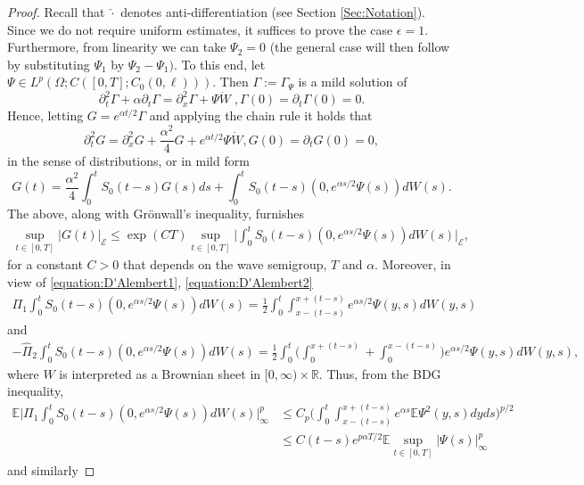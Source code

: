 \documentclass[10pt, reqno]{amsart}
\newcommand{\R}{\mathbb{R}}
\newcommand{\ex}{\mathbb{E}}
\newcommand{\e}{\mathcal{E}}
\theoremstyle{definition}
\numberwithin{lem}{section}
\numberwithin{cor}{section}
\numberwithin{prop}{section}
\numberwithin{thm}{section}
\numberwithin{dfn}{section}
\begin{document}
 \begin{proof}
 Recall that $\hat{\cdot}$ denotes anti-differentiation (see Section \ref{Sec:Notation}). Since we do not require uniform estimates, it suffices to prove the case $\epsilon=1.$ Furthermore, from linearity we can take $\Psi_2=0$ (the general case will then follow by substituting $\Psi_1$ by $\Psi_2-\Psi_1).$ To this end, let $\Psi\in L^p(\Omega; C([0,T]; C_0(0,\ell))).$ Then $\Gamma:=\Gamma_{\Psi}$ is a mild solution of
 $$ \partial_t^2\Gamma+\alpha\partial_t\Gamma=\partial^2_{x}\Gamma+\Psi\dot{W}\;, \Gamma(0)=\partial_t\Gamma(0)=0.     $$
 Hence, letting $G=e^{\alpha t/2}\Gamma$ and applying the chain rule it holds that 
 $$  \partial_t^2G=\partial^2_{x}G+\frac{\alpha^2}{4}G+e^{\alpha t/2}\Psi\dot{W}, G(0)=\partial_tG(0)=0,$$
in the sense of distributions, or in mild form
$$G(t)=\frac{\alpha^2}{4}\int_0^ t S_0(t-s)G(s)ds+\int_0^t S_0(t-s)(0, e^{\alpha s/2}\Psi(s))dW(s).$$
\noindent The above, along with Gr\"onwall's inequality, furnishes
\begin{equation*}
\begin{aligned}
    \sup_{t\in[0,T]}|G(t)|_{\e}\leq \exp(C T)\sup_{t\in[0,T]}\bigg|\int_0^t S_0(t-s)(0, e^{\alpha s/2}\Psi(s))dW(s)   \bigg|_{\e},
\end{aligned} 
\end{equation*}
for a constant $C>0$ that depends on the wave semigroup, $T$ and $\alpha.$
Moreover, in view of \eqref{equation:D'Alembert1}, \eqref{equation:D'Alembert2}
\begin{equation*}
\begin{aligned}
    \Pi_1\int_0^t S_0(t-s)(0, e^{\alpha s/2}\Psi(s))dW(s)
  =\frac{1}{2}\int_0^t\int_{x-(t-s)}^{x+(t-s)}e^{\alpha s/2}\Psi(y,s)dW(y,s)
\end{aligned} 
\end{equation*}
and 
\begin{equation*}
\begin{aligned}
     -\widehat{\Pi}_2\int_0^t S_0(t-s)(0, e^{\alpha s/2}\Psi(s))dW(s)= \frac{1}{2}\int_0^t\bigg(\int_{0}^{x+(t-s)}+\int_0^{x-(t-s)}\bigg)e^{\alpha s/2}\Psi(y,s)dW(y,s),
\end{aligned} 
\end{equation*}
where $W$ is interpreted as a Brownian sheet in $[0,
\infty)\times\R.$
Thus, from the BDG inequality,
\begin{equation*}
\begin{aligned}
    \ex \bigg|\Pi_1\int_0^t S_0(t-s)(0, e^{\alpha s/2}\Psi(s))dW(s)   \bigg|_{\infty}^p&\leq C_p\bigg(\int_0^t\int_{x-(t-s)}^{x+(t-s)}e^{\alpha s}\ex\Psi^2(y,s)dyds\bigg)^{p/2}\\&
    \leq C(t-s)e^{p\alpha T/2}\ex\sup_{t\in[0,T]}|\Psi(s)|^p_\infty
\end{aligned}
\end{equation*}
and similarly 


\end{proof}
\end{document}
